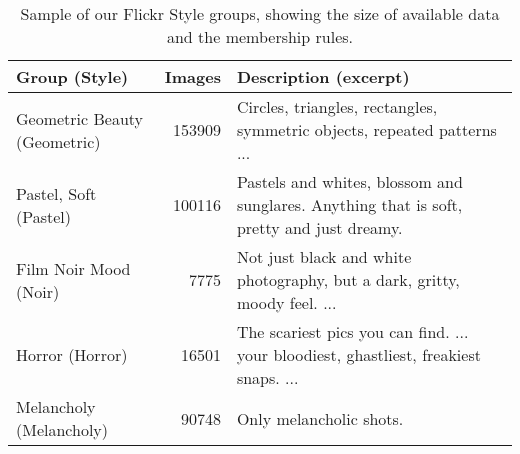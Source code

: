

\begin{table}
\caption {Sample of our Flickr Style groups, showing the size of available data and the membership rules.}
\label{tab:flickr_style}
{\small
    \begin{tabularx}{\linewidth}{m{2.3cm}rX}
    \textbf{Group (Style)}       & \textbf{Images} & \textbf{Description (excerpt)}                                                                                                                                                                             \\ \hline
    Geometric Beauty (Geometric) & 153909           & Circles, triangles, rectangles, symmetric objects, repeated patterns ...                                                                                            \\
    Pastel, Soft (Pastel)    & 100116           & Pastels and whites, blossom and sunglares. Anything that is soft, pretty and just dreamy.                                             \\
    Film Noir Mood  (Noir) & 7775             & Not just black and white photography, but a dark, gritty, moody feel. ... \\
    Horror (Horror)          & 16501            & The scariest pics you can find. ... your bloodiest, ghastliest, freakiest snaps. ...                       \\
    Melancholy (Melancholy)      & 90748            & Only melancholic shots.                                                                                                                                                                           \\
    \end{tabularx}
}
\end{table}
